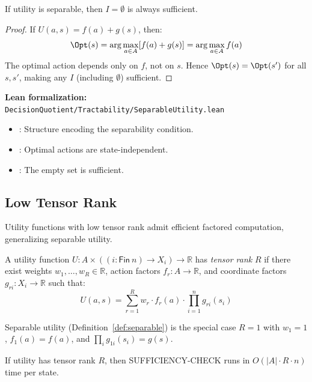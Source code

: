 \begin{theorem}\label{thm:separable}
If utility is separable, then $I = \emptyset$ is always sufficient.
\end{theorem}

\begin{proof}
If $U(a, s) = f(a) + g(s)$, then:
\[
\Opt(s) = \arg\max_{a \in A} [f(a) + g(s)] = \arg\max_{a \in A} f(a)
\]
The optimal action depends only on $f$, not on $s$. Hence $\Opt(s) = \Opt(s')$ for all $s, s'$, making any $I$ (including $\emptyset$) sufficient.
\end{proof}

\noindent\textbf{Lean formalization:} \texttt{DecisionQuotient/Tractability/SeparableUtility.lean}
\begin{itemize}
\item {}: Structure encoding the separability condition.
\item {}: Optimal actions are state-independent.
\item {}: The empty set is sufficient.
\end{itemize}


\subsection{Low Tensor Rank}\label{sec:tract-tensor}

Utility functions with low tensor rank admit efficient factored computation, generalizing separable utility.

\begin{definition}\label{def:tensor-rank}
A utility function $U : A \times ((i : \mathsf{Fin}\ n) \to X_i) \to \mathbb{R}$ has \emph{tensor rank} $R$ if there exist weights $w_1, \ldots, w_R \in \mathbb{R}$, action factors $f_r : A \to \mathbb{R}$, and coordinate factors $g_{ri} : X_i \to \mathbb{R}$ such that:
\[
U(a, s) = \sum_{r=1}^R w_r \cdot f_r(a) \cdot \prod_{i=1}^n g_{ri}(s_i)
\]
\end{definition}

\begin{remark}
Separable utility (Definition~\ref{def:separable}) is the special case $R = 1$ with $w_1 = 1$, $f_1(a) = f(a)$, and $\prod_i g_{1i}(s_i) = g(s)$.
\end{remark}

\begin{theorem}\label{thm:tensor-rank}
If utility has tensor rank $R$, then SUFFICIENCY-CHECK runs in $O(|A| \cdot R \cdot n)$ time per state.
\end{theorem}

